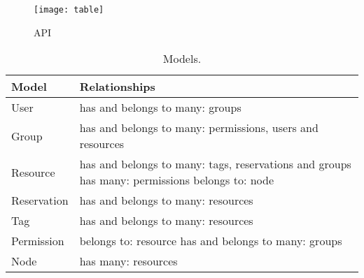 \documentclass{article}
\begin{document}
\begin{figure}[H]
\centering
\texttt{[image: table]}
\caption{API}
\end{figure}

\begin{table}[H]
	\begin{center}
	  \begin{tabular}{| l | l | }
	    \hline
	    Model & Relationships \\ \hline
	    User & has and belongs to many: groups \\ \hline
	    Group & has and belongs to many: permissions, users and resources \\ \hline
	    Resource & has and belongs to many: tags, reservations and groups \vline \: has many: permissions \vline \: belongs to: node \\ \hline
	    Reservation & has and belongs to many: resources \\ \hline
	    Tag & has and belongs to many: resources \\ \hline
	    Permission & belongs to: resource \vline \: has and belongs to many: groups \\ \hline
	    Node & has many: resources \\
	    \hline
	  \end{tabular}
	  \caption{\label{tab:table-name}Models.}
	\end{center}
\end{table}
\end{document}
